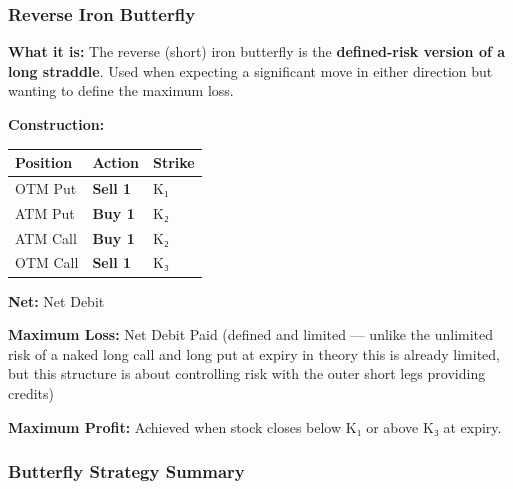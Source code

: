 \documentclass[12pt,openany]{book}
\begin{document}
\subsubsection{Reverse Iron Butterfly}

\textbf{What it is:} The reverse (short) iron butterfly is the \textbf{defined-risk version of a long straddle}. Used when expecting a significant move in either direction but wanting to define the maximum loss.

\textbf{Construction:}

\begin{center}
\scriptsize
\setlength{\tabcolsep}{3pt}
\begin{tabular}{|L{4.42cm}|L{4.42cm}|L{4.42cm}|}
\hline
Position & Action & Strike \\
\hline
OTM Put & \textbf{Sell 1} & K₁ \\
\hline
ATM Put & \textbf{Buy 1} & K₂ \\
\hline
ATM Call & \textbf{Buy 1} & K₂ \\
\hline
OTM Call & \textbf{Sell 1} & K₃ \\
\hline
\end{tabular}
\end{center}

\textbf{Net:} Net Debit

\textbf{Maximum Loss:} Net Debit Paid (defined and limited — unlike the unlimited risk of a naked long call and long put at expiry in theory this is already limited, but this structure is about controlling risk with the outer short legs providing credits)

\textbf{Maximum Profit:} Achieved when stock closes below K₁ or above K₃ at expiry.



\subsubsection{Butterfly Strategy Summary}
\end{document}
